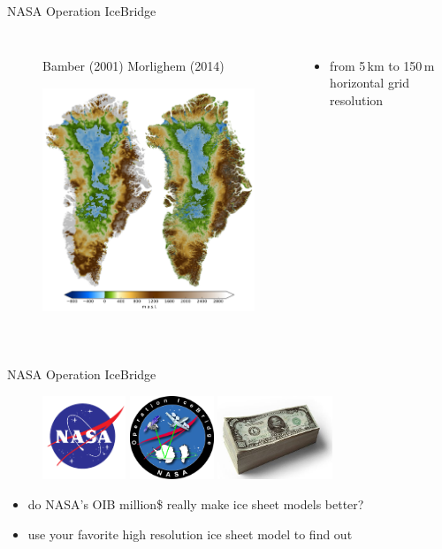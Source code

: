 \documentclass[hide notes,intlimits]{beamer}
\begin{document}
\begin{frame}{NASA Operation IceBridge}
  \begin{columns}
    \column[c]{8cm}
    \begin{figure}
      \small{Bamber (2001) \hspace{4em} Morlighem (2014)}
      \includegraphics[height=7.5cm]{greenland_bed}
    \end{figure}
    \column[c]{4cm}
    \begin{itemize}
    \item from 5\,km to 150\,m horizontal grid resolution
    \end{itemize}
  \end{columns}
\end{frame}

\begin{frame}{NASA Operation IceBridge}
  \begin{figure}
    \includegraphics[height=2.5cm]{nasa-logo} \qquad
    \includegraphics[height=2.5cm]{oib} \qquad
    \includegraphics[height=2.5cm]{1000-dollar-bills}
  \end{figure}
  \begin{itemize}
  \item do NASA's OIB million\$ really make ice sheet models better?
  \item use your favorite high resolution ice sheet model to find out
\end{itemize}
\end{frame}
\end{document}
